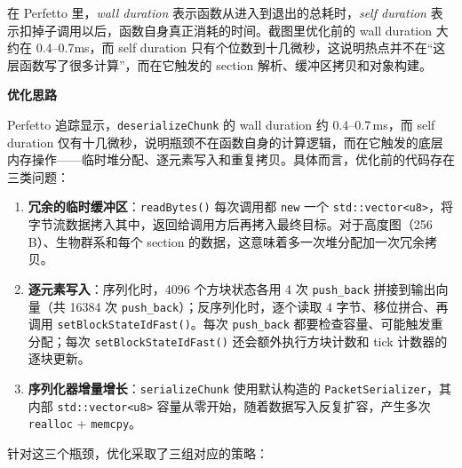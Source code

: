 在 Perfetto 里，\textit{wall duration} 表示函数从进入到退出的总耗时，\textit{self duration} 表示扣掉子调用以后，函数自身真正消耗的时间。截图里优化前的 wall duration 大约在 0.4--0.7ms，而 self duration 只有个位数到十几微秒，这说明热点并不在“这层函数写了很多计算”，而在它触发的 section 解析、缓冲区拷贝和对象构建。

\textbf{优化思路}

Perfetto 追踪显示，\texttt{deserializeChunk} 的 wall duration 约 0.4--0.7\,ms，而 self duration 仅有十几微秒，说明瓶颈不在函数自身的计算逻辑，而在它触发的底层内存操作——临时堆分配、逐元素写入和重复拷贝。具体而言，优化前的代码存在三类问题：

\begin{enumerate}
    \item \textbf{冗余的临时缓冲区}：\texttt{readBytes()} 每次调用都 \texttt{new} 一个 \texttt{std::vector<u8>}，将字节流数据拷入其中，返回给调用方后再拷入最终目标。对于高度图（256\,B）、生物群系和每个 section 的数据，这意味着多一次堆分配加一次冗余拷贝。
    \item \textbf{逐元素写入}：序列化时，4096 个方块状态各用 4 次 \texttt{push\_back} 拼接到输出向量（共 16384 次 \texttt{push\_back}）；反序列化时，逐个读取 4 字节、移位拼合、再调用 \texttt{setBlockStateIdFast()}。每次 \texttt{push\_back} 都要检查容量、可能触发重分配；每次 \texttt{setBlockStateIdFast()} 还会额外执行方块计数和 tick 计数器的逐块更新。
    \item \textbf{序列化器增量增长}：\texttt{serializeChunk} 使用默认构造的 \texttt{PacketSerializer}，其内部 \texttt{std::vector<u8>} 容量从零开始，随着数据写入反复扩容，产生多次 \texttt{realloc} + \texttt{memcpy}。
\end{enumerate}

针对这三个瓶颈，优化采取了三组对应的策略：

